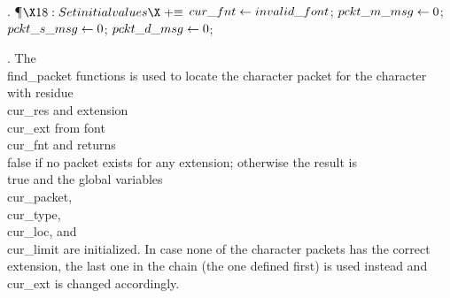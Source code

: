 . \P$\X18:Set initial values\X\mathrel{+}\S$\6
$\\{cur\_fnt}\gets\\{invalid\_font}$;\5
$\\{pckt\_m\_msg}\gets0$;\5
$\\{pckt\_s\_msg}\gets0$;\5
$\\{pckt\_d\_msg}\gets0$;\par
\fi

. The \\{find\_packet} functions is used to locate the character packet for
the character with residue~\\{cur\_res} and extension~\\{cur\_ext} from
font~\\{cur\_fnt} and returns \\{false} if no packet exists for any extension;
otherwise the result is \\{true} and the global variables \\{cur\_packet},
\\{cur\_type}, \\{cur\_loc}, and \\{cur\_limit} are initialized. In case none
of
the character packets has the correct extension, the last one in the
chain (the one defined first) is used instead and \\{cur\_ext} is changed
accordingly.


